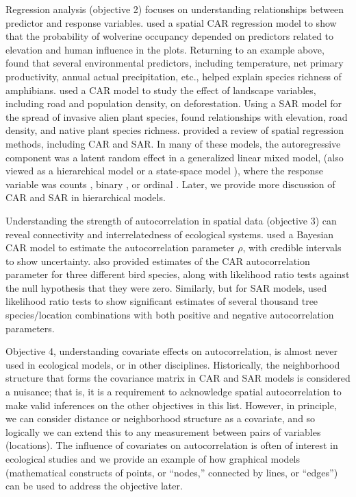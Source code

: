 \documentclass[11pt, titlepage]{article}\usepackage[]{graphicx}\usepackage[]{color}
\begin{document}
\begin{spacing}{1.9}
\begin{flushleft}
Regression analysis (objective 2) focuses on understanding relationships between predictor and response variables.  \citet{Gard:Lawl:Ver:Mago:Kell:coar:2010} used a spatial CAR regression model to show that the probability of wolverine occupancy depended on predictors related to elevation and human influence in the plots. Returning to an example above, \citet{Cass:Dini:Rang:Thia:spat:2007} found that several environmental predictors, including temperature, net primary productivity, annual actual precipitation, etc., helped explain species richness of amphibians.  \citet{Agar:Sila:Gelf:Dewa:Mick:trop:2005} used a CAR model to study the effect of landscape variables, including road and population density, on deforestation.  Using a SAR model for the spread of invasive alien plant species, \citet{Dark:biog:2004} found relationships with elevation, road density, and native plant species richness. \citet{Beal:Lenn:Year:Brew:Elst:regr:2010} provided a review of spatial regression methods, including CAR and SAR.  In many of these models, the autoregressive component was a latent random effect in a generalized linear mixed model, (also viewed as a hierarchical model \citep{Cres:Cald:Clar:VerH:acco:2009} or a state-space model \citep{deVa:Hast:fitt:2002}), where the response variable was counts \citep{Clay:Kald:empi:1987}, binary \citep{Gard:Lawl:Ver:Mago:Kell:coar:2010}, or ordinal \citep{Agar:Sila:Gelf:Dewa:Mick:trop:2005}.  Later, we provide more discussion of CAR and SAR in hierarchical models.

Understanding the strength of autocorrelation in spatial data (objective 3) can reveal connectivity and interrelatedness of ecological systems.  \citet{Gard:Lawl:Ver:Mago:Kell:coar:2010} used a Bayesian CAR model to estimate the autocorrelation parameter $\rho$, with credible intervals to show uncertainty. \citet{Lich:Simo:Shri:Fran:spat:2002} also provided estimates of the CAR autocorrelation parameter for three different bird species, along with likelihood ratio tests against the null hypothesis that they were zero.  Similarly, but for SAR models, \citet{Bull:Burk:eval:2005} used likelihood ratio tests to show significant estimates of several thousand tree species/location combinations with both positive and negative autocorrelation parameters.

Objective 4, understanding covariate effects on autocorrelation, is almost never used in ecological models, or in other disciplines. Historically, the neighborhood structure that forms the covariance matrix in CAR and SAR models is considered a nuisance; that is, it is a requirement to acknowledge spatial autocorrelation to make valid inferences on the other objectives in this list. However, in principle, we can consider distance or neighborhood structure as a covariate, and so logically we can extend this to any measurement between pairs of variables (locations). The influence of covariates on autocorrelation is often of interest in ecological studies \citep{Hank:Hoot:circ:2013} and we provide an example of how graphical models (mathematical constructs of points, or ``nodes,'' connected by lines, or ``edges'') can be used to address the objective later. 


\end{flushleft}
\end{spacing}
\end{document}
